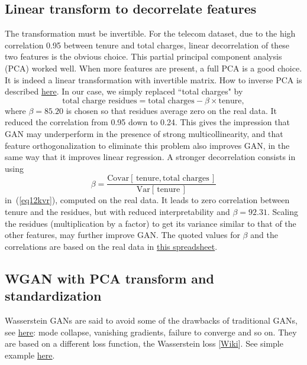 \documentclass[oneside,10pt]{book}
\begin{document}
\subsection{Linear transform to decorrelate features}\label{lin12qdj}

The transformation must be invertible.  For the telecom dataset, due to the high correlation 0.95 between tenure and total charges, linear decorrelation of these two features is the obvious choice. This partial \textcolor{index}{principal component analysis} (PCA) worked well. When more features are present, a full PCA is a good choice. It is indeed a linear transformation with invertible matrix. How to
 inverse PCA is described \href{https://stats.stackexchange.com/questions/229092/how-to-reverse-pca-and-reconstruct-original-variables-from-several-principal-com}{here}. In our case, we simply replaced ``total charges" by
\begin{equation}
\text{total charge residues} = \text{total charges} - \beta \times \text{tenure}, \label{eq12kvr}
\end{equation}
where $\beta = 85.20$ is chosen so that residues average zero on the real data. It reduced the correlation from 0.95 down to 0.24.  This gives the impression that GAN may underperform in the presence of strong
 multicollinearity, and that feature orthogonalization to eliminate this problem also improves GAN, in the same way that it improves
 linear regression. A stronger decorrelation consists in using
$$
\beta = \frac{\text{Covar}[\,\text{tenure}, \text{total charges}\,]}{\text{Var}[\,\text{tenure}\,]}
$$
 in~(\ref{eq12kvr}), computed on the real data. It leads to zero correlation between tenure and the residues, but with reduced
 interpretability and $\beta=92.31$. Scaling the residues (multiplication by a factor) to get its variance similar to that of the other features, may further improve GAN. The quoted values for $\beta$ and the correlations are based on the real data in
 \href{https://github.com/VincentGranville/Main/blob/main/telecom.xlsx}{this spreadsheet}.



\subsection{WGAN with PCA transform and standardization}

Wasserstein GANs are said to avoid some of the drawbacks of traditional GANs, see
\href{https://developers.google.com/machine-learning/gan/problems}{here}: \textcolor{index}{mode collapse},
vanishing gradients, failure to converge and so on. They are based on a different loss function, the
\textcolor{index}{Wasserstein loss} [\href{https://en.wikipedia.org/wiki/Wasserstein_GAN}{Wiki}].
 See simple example \href{https://machinelearningmastery.com/how-to-code-a-wasserstein-generative-adversarial-network-wgan-from-scratch/}{here}.
\end{document}

